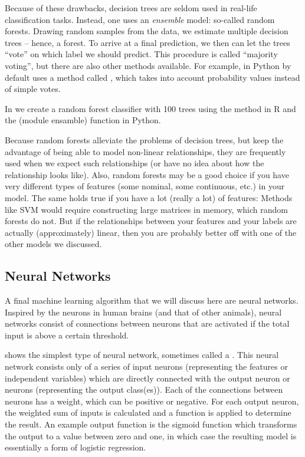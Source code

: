 Because of these drawbacks, decision trees are seldom used in
real-life classification tasks.  Instead, one uses an \emph{ensemble} model: so-called random forests.  Drawing random samples from the data, we estimate multiple
decision trees -- hence, a forest.  To arrive at a final prediction,
we then can let the trees ``vote'' on which label we should
predict. This procedure is called ``majority voting'', but there are
also other methods available. For example,  in Python  by default uses a method called , which takes into
account probability values instead of simple votes.

In  we create a random forest classifier with 100 trees using the  method  in R and the  (module ensamble) function  in Python.


Because random forests alleviate the problems of decision trees, but
keep the advantage of being able to model non-linear relationships,
they are frequently used when we expect such relationships (or have no
idea about how the relationship looks like).  Also, random forests may
be a good choice if you have very different types of features (some
nominal, some continuous, etc.) in your model. The same holds true if
you have a lot (really a lot) of features: Methods like SVM would require
constructing large matrices in memory, which random forests do not.
But if the relationships between your features and your labels are
actually (approximately) linear, then you are probably better off with
one of the other models we discussed.


\subsection{Neural Networks} \label{sec:neural}

A final machine learning algorithm that we will discuss here are neural networks.
Inspired by the neurons in human brains (and that of other animals),
neural networks consist of connections between neurons that are activated if the
total input is above a certain threshold.

 shows the simplest type of neural network, sometimes called a .
This neural network consists only of a series of input neurons (representing the features or independent variables)
which are directly connected with the output neuron or neurons (representing the output class(es)).
Each of the connections between neurons has a weight, which can be positive or negative.
For each output neuron, the weighted sum of inputs is calculated and a function is applied to determine the result.
An example output function is the sigmoid function which transforms the output to a value between zero and one,
in which case the resulting model is essentially a form of logistic regression.

